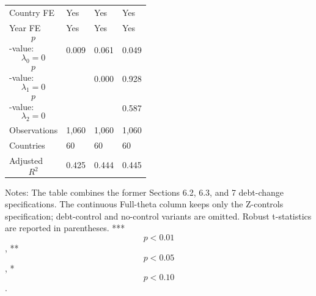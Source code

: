 \begin{table}[H]
\begin{threeparttable}
\begin{tabularx}{\textwidth}{lYYY}
Country FE & Yes & Yes & Yes \\
Year FE & Yes & Yes & Yes \\
$$p$$-value: $$\lambda_0=0$$ & 0.009 & 0.061 & 0.049 \\
$$p$$-value: $$\lambda_1=0$$ &  & 0.000 & 0.928 \\
$$p$$-value: $$\lambda_2=0$$ &  &  & 0.587 \\
Observations & 1,060 & 1,060 & 1,060 \\
Countries & 60 & 60 & 60 \\
Adjusted $$R^2$$ & 0.425 & 0.444 & 0.445 \\
\bottomrule
\end{tabularx}
\begin{tablenotes}[flushleft]\footnotesize
\item Notes: The table combines the former Sections 6.2, 6.3, and 7 debt-change specifications. The continuous Full-theta column keeps only the Z-controls specification; debt-control and no-control variants are omitted. Robust t-statistics are reported in parentheses. *** $$p<0.01$$, ** $$p<0.05$$, * $$p<0.10$$.
\end{tablenotes}
\end{threeparttable}
\end{table}
